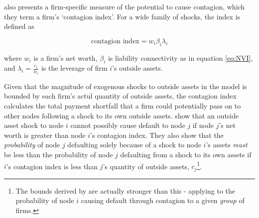 \citet{glasserman2015likely} also presents a firm-specific measure of the potential to cause contagion, which they term a firm's `contagion index'. For a wide family of shocks, the index is defined as 

\[\text{contagion index} = w_i \beta_i \lambda_i\]

\noindent where $w_i$ is a firm's net worth, $\beta_i$ is liability connectivity as in equation \ref{eq:NVI}, and $\lambda_i=\frac{c_i}{w_i}$ is the leverage of firm $i$'s outside assets. 

Given that the magnitude of exogenous shocks to outside assets in the model is bounded by each firm's actul quantity of outside assets, the contagion index calculates the total payment shortfall that a firm could potentially pass on to other nodes following a shock to its own outside assets. \citet{glasserman2015likely} show that an outside asset shock to node $i$ cannot possibly cause default to node $j$ if node $j$'s net worth is greater than node $i$'s contagion index. They also show that the \textit{probability} of node $j$ defaulting solely because of a shock to node $i$'s assets \textit{must} be less than the probability of node $j$ defaulting from a shock to its own assets if $i$'s contagion index is less than $j$'s quantity of outside assets, $c_j$\footnote{The bounds derived by \citet{glasserman2015likely} are actually stronger than this - applying to the probability of node $i$ causing default through contagion to a given \textit{group} of firms.}.